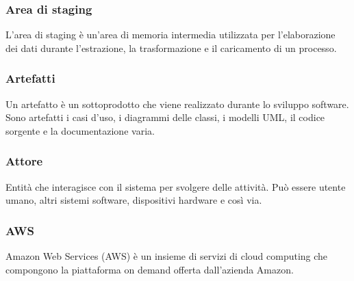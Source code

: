 \subsubsection*{Area di staging}
L'area di staging è un'area di memoria intermedia utilizzata per l'elaborazione dei dati durante l'estrazione, la trasformazione e il caricamento di un processo.

\subsubsection*{Artefatti}
Un artefatto è un sottoprodotto che viene realizzato durante lo sviluppo software. Sono artefatti i casi d'uso, i diagrammi delle classi, i modelli UML\glo, il codice sorgente e la documentazione varia.

\subsubsection*{Attore}
Entità che interagisce con il sistema per svolgere delle attività. Può essere utente umano, altri sistemi software, dispositivi hardware e così via.

\subsubsection*{AWS}
Amazon Web Services (AWS) è un insieme di servizi di cloud computing che compongono la piattaforma on demand offerta dall’azienda Amazon.

